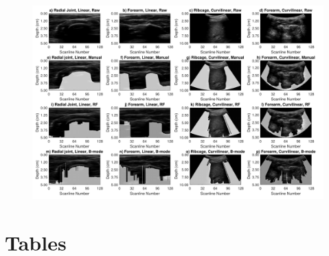 \documentclass[preprint,5p,authoryear]{elsarticle}
\begin{document}
\begin{figure}
	\centering
	\includegraphics[scale=0.6]{fig1.pdf}
\end{figure}





\pagebreak

\section*{Tables}
\end{document}
